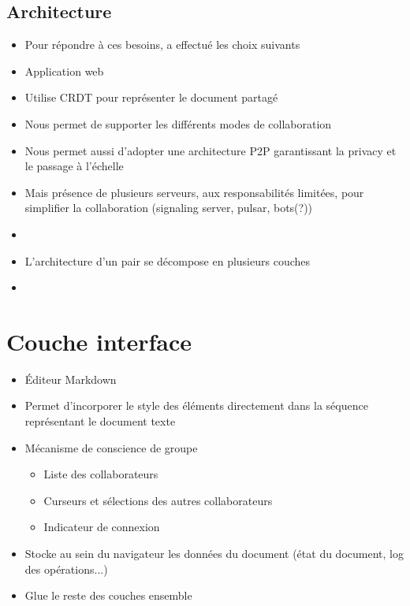 \documentclass[12pt]{thesul}
\begin{document}
\subsection{Architecture}

\begin{itemize}
  \item Pour répondre à ces besoins, a effectué les choix suivants
  \item Application web
  \item Utilise CRDT pour représenter le document partagé
  \item Nous permet de supporter les différents modes de collaboration
  \item Nous permet aussi d'adopter une architecture P2P garantissant la privacy et le passage à l'échelle
  \item Mais présence de plusieurs serveurs, aux responsabilités limitées, pour simplifier la collaboration (signaling server, pulsar, bots(?))
  \item {}
  \item L'architecture d'un pair se décompose en plusieurs couches
  \item {}
\end{itemize}

\section{Couche interface}

\begin{itemize}
  \item Éditeur Markdown
  \item Permet d'incorporer le style des éléments directement dans la séquence représentant le document texte
  \item Mécanisme de conscience de groupe
  \begin{itemize}
    \item Liste des collaborateurs
    \item Curseurs et sélections des autres collaborateurs
    \item Indicateur de connexion
  \end{itemize}
  \item Stocke au sein du navigateur les données du document (état du document, log des opérations...)
  \item Glue le reste des couches ensemble
\end{itemize}
\end{document}
